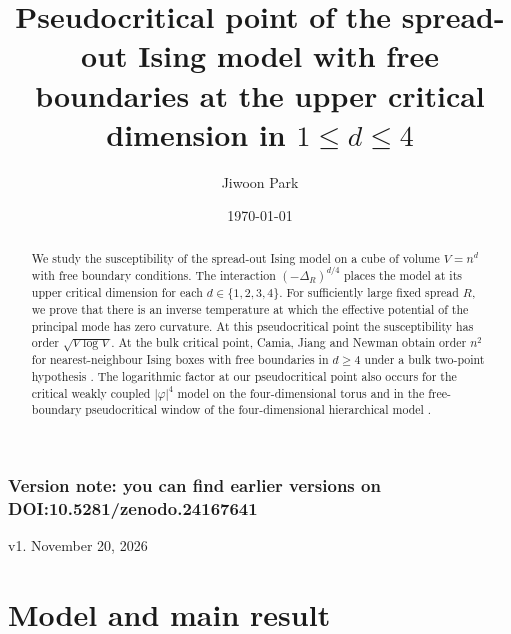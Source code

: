 \documentclass[11pt]{article}
\title{Pseudocritical point of the spread-out Ising model with free boundaries at the upper critical dimension in \(1\le d\le4\)}
\author{Jiwoon Park}
\date{\today}
\theoremstyle{definition}
\begin{document}
\maketitle

\begin{abstract}
We study the susceptibility of the spread-out Ising model on a cube
of volume \(V=n^d\) with free boundary conditions. The interaction
\((-\Delta_R)^{d/4}\) places the model at its upper critical dimension
for each \(d\in\{1,2,3,4\}\). For sufficiently large fixed spread \(R\),
we prove that there is an inverse temperature at which the effective
potential of the principal mode has zero curvature. At this
pseudocritical point the susceptibility has order \(\sqrt{V\log V}\).
At the bulk critical point, Camia, Jiang and Newman obtain order \(n^2\)
for nearest-neighbour Ising boxes with free boundaries in \(d\ge4\)
under a bulk two-point hypothesis \cite{CamiaJiangNewman2021}.
The logarithmic factor at our pseudocritical point also occurs for the critical weakly coupled
\(\lvert\varphi\rvert^4\) model on the four-dimensional torus
\cite{TorusFSS} and in the free-boundary pseudocritical window of the
four-dimensional hierarchical model \cite{HierarchicalFBC}.
\end{abstract}

\subsubsection*{Version note: you can find earlier versions on DOI:10.5281/zenodo.24167641}

v1. November 20, 2026

\section{Model and main result}\label{sec:model}
\end{document}
